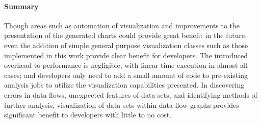 \paragraph{Summary}
Though areas such as automation of visualization and improvements to the presentation of the generated charts could provide great benefit in the future, even the addition of simple general purpose visualization classes such as those implemented in this work provide clear benefit for developers. The introduced overhead to performance is negligible, with linear time execution in almost all cases; and developers only need to add a small amount of code to pre-existing analysis jobs to utilize the visualization capabilities presented. In discovering errors in data flows, unexpected features of data sets, and identifying methods of further analysis, visualization of data sets within data flow graphs provides significant benefit to developers with little to no cost.